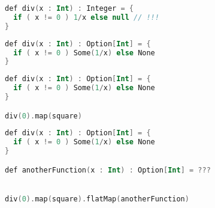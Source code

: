 \documentclass[10pt]{beamer}
\begin{document}
\begin{frame}[fragile]
\begin{lstlisting}[language=Kotlin, basicstyle=\ttfamily]
def div(x : Int) : Integer = {
  if ( x != 0 ) 1/x else null // !!!
}
\end{lstlisting}
\end{frame}

\begin{frame}[fragile]
\begin{lstlisting}[language=Kotlin, basicstyle=\ttfamily]
def div(x : Int) : Option[Int] = {
  if ( x != 0 ) Some(1/x) else None
}
\end{lstlisting}
\end{frame}

\begin{frame}[fragile]
\begin{lstlisting}[language=Kotlin, basicstyle=\ttfamily]
def div(x : Int) : Option[Int] = {
  if ( x != 0 ) Some(1/x) else None
}

div(0).map(square)
\end{lstlisting}
\end{frame}

\begin{frame}[fragile]
\begin{lstlisting}[language=Kotlin, basicstyle=\ttfamily]
def div(x : Int) : Option[Int] = {
  if ( x != 0 ) Some(1/x) else None
}

def anotherFunction(x : Int) : Option[Int] = ???


div(0).map(square).flatMap(anotherFunction)
\end{lstlisting}
\end{frame}




\end{document}
